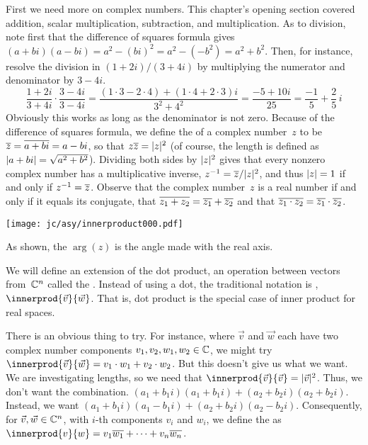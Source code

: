 First we need more on complex numbers.
This chapter's opening section covered addition, scalar multiplication,
subtraction, and multiplication.
As to division, note first that the difference of squares formula
gives $(a+bi)(a-bi)=a^2-(bi)^2=a^2-(-b^2)=a^2+b^2$.
Then, for instance, resolve the division in $(1+2i)/(3+4i)$
by multiplying the numerator and denominator by $3-4i$.
\begin{equation*}
  \frac{1+2i}{3+4i}\cdot\frac{3-4i}{3-4i}
  =
  \frac{(1\cdot 3-2\cdot 4)+(1\cdot 4+2\cdot 3)i}{3^2+4^2}
  =
  \frac{-5+10i}{25}
  =
  \frac{-1}{5}+\frac{2}{5}\,i
\end{equation*}
Obviously this works as long as the denominator is not zero.
Because of the difference of squares formula,
we define the  of a complex number~$z$
to be $\overline{z}=\overline{a+bi}=a-bi$, so that $z\overline{z}=\lvert z\rvert^2$
(of course, the length is defined as $\lvert a+bi\rvert=\sqrt{a^2+b^2}$).
Dividing both sides by $\lvert z\rvert^2$ gives that  
every nonzero complex number has a multiplicative inverse,
$z^{-1}=\overline{z}/\lvert z\rvert^2$,
and thus $\lvert z\rvert=1$ if and only if $z^{-1}=\overline{z}$.
Observe that the complex number~$z$ is a real number if and only if 
it equals its conjugate, that $\overline{z_1+z_2}=\overline{z_1}+\overline{z_2}$
and that $\overline{z_1\cdot z_2}=\overline{z_1}\cdot\overline{z_2}$.
\begin{center}
  \texttt{[image: jc/asy/innerproduct000.pdf]}
\end{center}
As shown, the  $\arg(z)$ is the angle 
made with the real axis.

We will define an extension of the dot product, an
operation between vectors from~$\mathbb{C}^n$ called the .
Instead of using a dot, the traditional notation is ,
$\innerprod{\vec{v}}{\vec{w}}$.
That is, dot product is the special case of inner product for real spaces.

There is an obvious thing to try.
For instance, 
where
$\vec{v}$ and $\vec{w}$ each have two complex number components
$v_1,v_2,w_1,w_2\in\mathbb{C}$,
we might try  
$\innerprod{\vec{v}}{\vec{w}}=v_1\cdot w_1+v_2\cdot w_2$.
But this doesn't give us what we want.
We are investigating lengths,
so we need that $\innerprod{\vec{v}}{\vec{v}}=\absval{\vec{v}}^2$.
Thus, we don't want the combination.
$(a_1+b_1i)(a_1+b_1i)+(a_2+b_2i)(a_2+b_2i)$. 
Instead, we want
$(a_1+b_1i)(a_1-b_1i)+(a_2+b_2i)(a_2-b_2i)$.
Consequently, for $\vec{v},\vec{w}\in\mathbb{C}^n$, with $i$-th components $v_i$ 
and $w_i$, we define the 
as $\innerprod{v}{w}=v_1\compconj{w_1}+\cdots+v_n\compconj{w_n}$.

